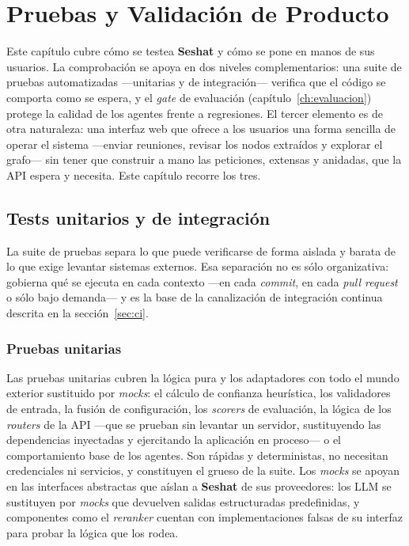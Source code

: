 \chapter{Pruebas y Validación de Producto}
\label{ch:pruebas}

Este capítulo cubre cómo se testea \textbf{Seshat} y cómo se pone en manos de sus usuarios. La
comprobación se apoya en dos niveles complementarios: una suite de pruebas automatizadas
—unitarias y de integración— verifica que el código se comporta como se espera, y el \textit{gate}
de evaluación (capítulo~\ref{ch:evaluacion}) protege la calidad de los agentes frente a regresiones.
El tercer elemento es de otra naturaleza: una interfaz web que ofrece a los usuarios una forma
sencilla de operar el sistema —enviar reuniones, revisar los nodos extraídos y explorar el grafo—
sin tener que construir a mano las peticiones, extensas y anidadas, que la \ac{API} espera y necesita.
Este capítulo recorre los tres.

\section{Tests unitarios y de integración}
\label{sec:tests}

La suite de pruebas separa lo que puede verificarse de forma aislada y barata de lo que exige
levantar sistemas externos. Esa separación no es sólo organizativa: gobierna qué se ejecuta en cada
contexto —en cada \textit{commit}, en cada \textit{pull request} o sólo bajo demanda— y es la base
de la canalización de integración continua descrita en la sección~\ref{sec:ci}.

\subsection{Pruebas unitarias}

Las pruebas unitarias cubren la lógica pura y los adaptadores con todo el mundo exterior sustituido
por \textit{mocks}: el cálculo de confianza heurística, los validadores de entrada, la fusión de
configuración, los \textit{scorers} de evaluación, la lógica de los \textit{routers} de la \ac{API}
—que se prueban sin levantar un servidor, sustituyendo las dependencias inyectadas y ejercitando la
aplicación en proceso— o el comportamiento base de los agentes. Son rápidas y deterministas, no necesitan credenciales ni
servicios, y constituyen el grueso de la suite. Los \textit{mocks} se apoyan en las interfaces
abstractas que aíslan a \textbf{Seshat} de sus proveedores: los \ac{LLM} se sustituyen por
\textit{mocks} que devuelven salidas estructuradas predefinidas, y componentes como el
\textit{reranker} cuentan con implementaciones falsas de su interfaz para probar la lógica que los
rodea.

